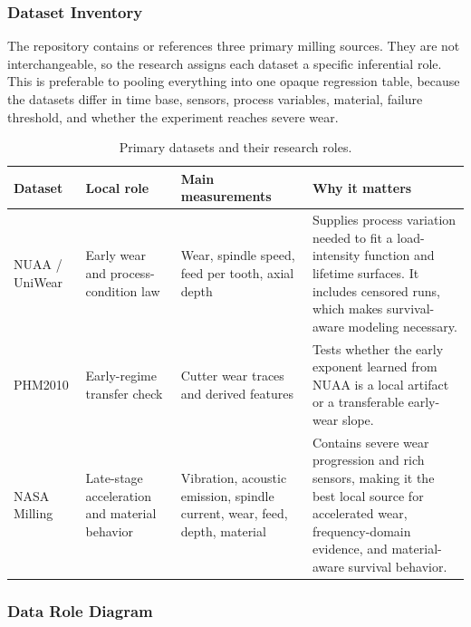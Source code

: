 \documentclass[11pt,a4paper]{article}
\begin{document}
\subsubsection{Dataset Inventory}

The repository contains or references three primary milling sources. They are not interchangeable, so the research assigns each dataset a specific inferential role. This is preferable to pooling everything into one opaque regression table, because the datasets differ in time base, sensors, process variables, material, failure threshold, and whether the experiment reaches severe wear.

\begin{table}[!htbp]
  \centering
  \caption{Primary datasets and their research roles.}
  \label{tab:dataset-roles}
  \small
  \begin{tabularx}{\textwidth}{p{2.3cm}p{2.9cm}p{2.4cm}Y}
    \toprule
    Dataset & Local role & Main measurements & Why it matters \\
    \midrule
    NUAA / UniWear & Early wear and process-condition law & Wear, spindle speed, feed per tooth, axial depth & Supplies process variation needed to fit a load-intensity function and lifetime surfaces. It includes censored runs, which makes survival-aware modeling necessary. \\
    PHM2010 & Early-regime transfer check & Cutter wear traces and derived features & Tests whether the early exponent learned from NUAA is a local artifact or a transferable early-wear slope. \\
    NASA Milling & Late-stage acceleration and material behavior & Vibration, acoustic emission, spindle current, wear, feed, depth, material & Contains severe wear progression and rich sensors, making it the best local source for accelerated wear, frequency-domain evidence, and material-aware survival behavior. \\
    \bottomrule
  \end{tabularx}
\end{table}

\subsubsection{Data Role Diagram}
\end{document}
